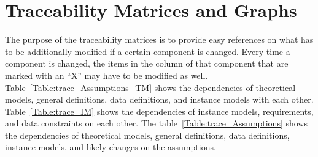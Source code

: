 \documentclass[12pt]{article}
\begin{document}
\section{Traceability Matrices and Graphs}

The purpose of the traceability matrices is to provide easy references on what
has to be additionally modified if a certain component is changed.  Every time a
component is changed, the items in the column of that component that are marked
with an ``X'' may have to be modified as well.  Table~\ref{Table:trace_Assumptions_TM} shows the
dependencies of theoretical models, general definitions, data definitions, and
instance models with each other. Table~\ref{Table:trace_IM} shows the
dependencies of instance models, requirements, and data constraints on each
other. The table~\ref{Table:trace_Assumptions} shows the dependencies of theoretical models,
general definitions, data definitions, instance models, and likely changes on
the assumptions.
\clearpage
\FloatBarrier
\end{document}
